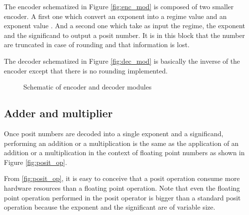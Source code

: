 The encoder schematized in Figure \ref{fig:enc_mod} is composed of two smaller encoder. A first one which convert an exponent into a regime value and an exponent value . And a second one which take as input the regime, the exponent and the significand to output a posit number. It is in this block that the number are truncated in case of rounding and that information is lost. 

The decoder schematized in Figure \ref{fig:dec_mod} is basically the inverse of the encoder except that there is no rounding implemented.

\begin{figure}[!ht]
\begin{mdframed}
	\caption{Schematic of encoder and decoder modules }
	\label{fig:enc_dec_mod}
\end{mdframed}
\end{figure}

\subsection{Adder and multiplier}
Once posit numbers are decoded into a single exponent and a significand, performing an addition or a multiplication is the same as the application of an addition or a multiplication in the context of floating point numbers as shown in Figure \ref{fig:posit_op}.

From \ref{fig:posit_op}, it is easy to conceive that a posit operation consume more hardware resources than a floating point operation. Note that even the floating point operation performed in the posit operator is bigger than a standard posit operation because the exponent and the significant are of variable size. 


